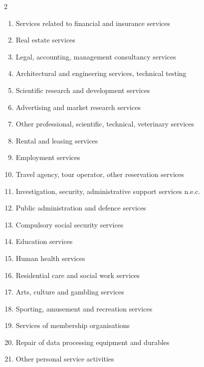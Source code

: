\documentclass{article}
\begin{document}
\begin{multicols}{2}
\begin{enumerate}[leftmargin=*,itemsep=0pt,parsep=0pt]
\item Services related to financial and insurance services
\item Real estate services
\item Legal, accounting, management consultancy services
\item Architectural and engineering services, technical testing
\item Scientific research and development services
\item Advertising and market research services
\item Other professional, scientific, technical, veterinary services
\item Rental and leasing services
\item Employment services
\item Travel agency, tour operator, other reservation services
\item Investigation, security, administrative support services n.e.c.
\item Public administration and defence services
\item Compulsory social security services
\item Education services
\item Human health services
\item Residential care and social work services
\item Arts, culture and gambling services
\item Sporting, amusement and recreation services
\item Services of membership organisations
\item Repair of data processing equipment and durables
\item Other personal service activities
\end{enumerate}

\end{multicols}
\end{document}
